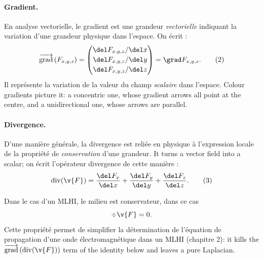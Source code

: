 \paragraph{Gradient.}
En analyse vectorielle, le gradient est une grandeur \emph{vectorielle}
indiquant la variation d'une grandeur physique dans l'espace. On écrit :
\[
  \overrightarrow{\mathrm{grad}}\,(F_{x,y,z}) =
  \begin{pmatrix}
    \del F_{x,y,z}/\del x \\[2pt]
    \del F_{x,y,z}/\del y \\[2pt]
    \del F_{x,y,z}/\del z
  \end{pmatrix}
  = \grad F_{x,y,z}.
  \tag*{(2)}
\]
Il représente la variation de la valeur du champ \emph{scalaire} dans l'espace.
Colour gradients picture it: a concentric one, whose gradient arrows all point
at the centre, and a unidirectional one, whose arrows are parallel.

\paragraph{Divergence.}
D'une manière générale, la divergence est reliée en physique à l'expression
locale de la propriété de \emph{conservation} d'une grandeur. It turns a vector
field into a scalar; on écrit l'opérateur divergence de cette manière :
\[
  \mathrm{div}(\v{F}) = \frac{\del F_x}{\del x} + \frac{\del F_y}{\del y}
    + \frac{\del F_z}{\del z}.
  \tag*{(3)}
\]

\begin{remark}
  Dans le cas d'un MLHI, le milieu est conservateur, dans ce cas
  \[ \div\v{F} = 0 . \]
  Cette propriété permet de simplifier la détermination de l'équation de
  propagation d'une onde électromagnétique dans un MLHI (chapitre 2): it kills
  the $\overrightarrow{\mathrm{grad}}\,(\mathrm{div}(\v{F}))$ term of the
  identity below and leaves a pure Laplacian.
\end{remark}

